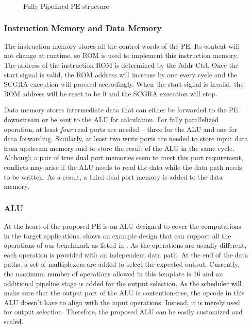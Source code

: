 \begin{figure}[h]
\center{\texttt{[image: pe]}}
\caption{Fully Pipelined PE structure}
\label{fig:pe}
\end{figure}

\subsubsection{Instruction Memory and Data Memory}
The instruction memory stores all the control words of the PE. Its content will not change at runtime, so ROM is used to implement this instruction memory. The address of the instruction ROM is determined by the Addr-Ctrl. Once the start signal is valid, the ROM address will increase by one every cycle and the SCGRA execution will proceed accrodingly. When the start signal is invalid, the ROM address will be reset to be 0 and the SCGRA execution will stop.

Data memory stores intermediate data that can either be forwarded to the PE downstream or be sent to the ALU for calculation. For fully parallelized operation, at least \emph{four} read ports are needed -- three for the ALU and one for data forwarding. Similarly, at least two write ports are needed to store input data from upstream memory and to store the result of the ALU in the same cycle. Although a pair of true dual port memories seem to meet this port requirement, conflicts may arise if the ALU needs to read the data while the data path needs to be written. As a result, a third dual port memory is added to the data memory.

\subsubsection{ALU}
At the heart of the proposed PE is an ALU designed to cover the computations in the target applications.  shows an example design that can support all the operations of our benchmark as listed in . As the operations are usually different, each operation is provided with an independent data path. At the end of the data paths, a set of multiplexers are added to select the expected output. Currently, the maximum number of operations allowed in this template is 16 and an additional pipeline stage is added for the output selection. As the scheduler will make sure that the output port of the ALU is contention-free, the opcode in this ALU doesn't have to align with the input operations. Instead, it is merely used for output selection. Therefore, the proposed ALU can be easily customized and scaled.

